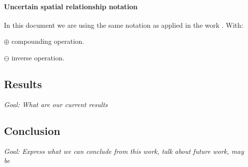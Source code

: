 \paragraph{Uncertain spatial relationship notation} In this document we are using the same notation as applied in the work \cite{Wang04a}. With:

$\oplus$ compounding operation.

$\ominus$ inverse operation.

\subsection{Results}

\textit{Goal: What are our current results}

\subsection{Conclusion}

\textit{Goal: Express what we can conclude from this work, talk about future work, may be}